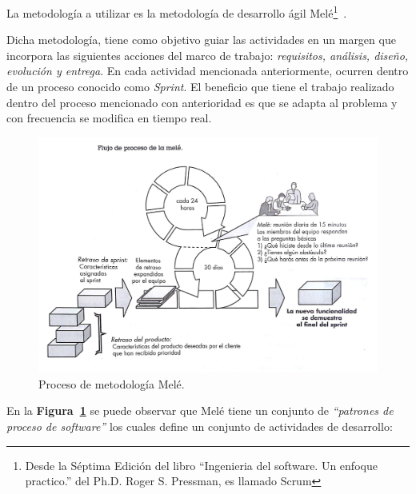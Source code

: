 

La metodología a utilizar es la metodología de desarrollo ágil Melé\footnote{Desde la Séptima Edición del libro ``Ingenieria del software. Un enfoque practico.'' del Ph.D. Roger S. Pressman, es llamado Scrum }~\cite{7}.

Dicha metodología, tiene como objetivo guiar las actividades en un margen que incorpora las siguientes acciones del marco de trabajo: \emph{requisitos, análisis, diseño, evolución y entrega}. En cada actividad mencionada anteriormente, ocurren dentro de un proceso conocido como \emph{Sprint}. El beneficio que tiene el trabajo realizado dentro del proceso mencionado con anterioridad  es que se adapta al problema y con frecuencia se modifica en tiempo real.

\begin{figure}[!hb]
	\includegraphics[width=\textwidth]{Imagenes/mele.jpg}
	\caption{\label{fig: procesoMele} Proceso de metodología Melé.}
\end{figure}

En la \textbf{Figura~\ref{fig: procesoMele}} se puede observar que Melé tiene un conjunto de \emph{``patrones de proceso de software''} los cuales define un conjunto de actividades de desarrollo:

